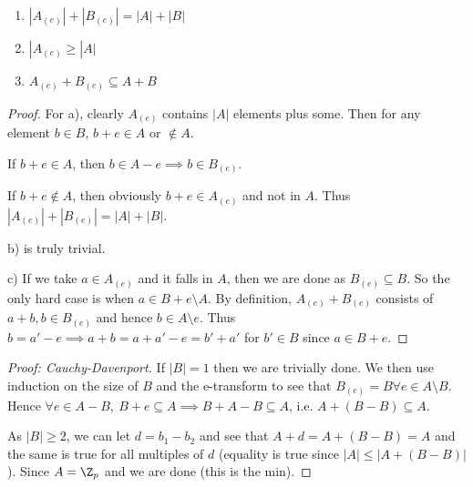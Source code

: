 \documentclass[a4paper]{article}
\begin{document}
\begin{lem}
	\begin{enumerate}
		\item $|A_{(e)}| + |B_{(e)}| = |A| + |B| $
		\item $|A_{(e)}\ge |A| $
		\item $A_{(e)}+B_{(e)} \subseteq A+B $
	\end{enumerate}
\end{lem}
\begin{proof}
	For a), clearly $A_{(e)} $ contains $|A| $ elements plus some.
	Then for any element $b \in B $, $b+e \in A $ or $\not\in A $.

	If $b+e \in A $, then $b \in A-e \implies b \in B_{(e)} $.

	If $b+e \not\in A $, then obviously $b+e \in A_{(e)} $ and not in $A $.
	Thus $|A_{(e)}| + |B_{(e)}| = |A| + |B| $.

	b) is truly trivial.

	c) If we take $a \in A_{(e)} $ and it falls in $A $, then we are done as $B_{(e)} \subseteq B $.
	So the only hard case is when $a \in B+e \setminus A $.
	By definition, $A_{(e)}+B_{(e)} $ consists of $a + b, b \in B_{(e)} $ and hence $b \in A \setminus e $.
	Thus $b = a' - e \implies a + b = a + a'-e = b' + a'$ for $b' \in B $ since $a \in B+e $.
\end{proof}

\begin{proof}[Proof: Cauchy-Davenport]
	If $|B| = 1 $ then we are trivially done.
	We then use induction on the size of $B $ and the e-transform to see that $B_{(e)} = B \forall e \in A \setminus B $.
 	Hence $\forall e \in A- B,\ B+e \subseteq A \implies B + A-B \subseteq A $, i.e. $A + (B-B) \subseteq A $.

	As $|B| \ge 2 $, we can let $d = b_{1}-b_{2} $ and see that $A + d = A + (B-B) = A $ and the same is true for all multiples of $d $ (equality is true since $|A| \le |A+(B-B)| $).
	Since $A = \Z_p $ and we are done (this is the min).
\end{proof}
\end{document}
